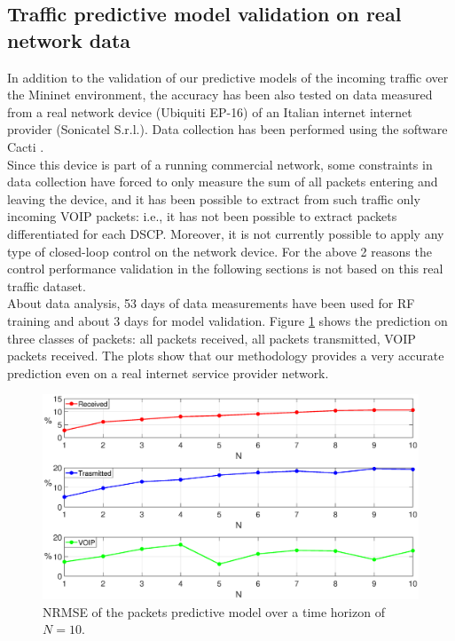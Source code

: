 \subsection{Traffic predictive model validation on real network data}

{In addition to the validation of our predictive models of the incoming traffic over the Mininet environment, the accuracy has been also tested on data measured from a real network device (Ubiquiti EP-16) of an Italian internet internet provider (Sonicatel S.r.l.). Data collection has been performed using the software Cacti \cite{Cacti}.\\
Since this device is part of a running commercial network, some constraints in data collection have forced to only measure the sum of all packets entering and leaving the device, and it has been possible to extract from such traffic only incoming VOIP packets: i.e., it has not been possible to extract packets differentiated for each DSCP. Moreover, it is not currently possible to apply any type of closed-loop control on the network device. For the above 2 reasons the control performance validation in the following sections is not based on this real traffic dataset.\\
About data analysis, 53 days of data measurements have been used for RF training and about 3 days for model validation. Figure \ref{fig:{errorPescara}} shows the prediction on three classes of packets: all packets received, all packets transmitted, VOIP packets received. The plots show that our methodology provides a very accurate prediction even on a real internet service provider network.}
\begin{figure}[h!]
	\centering
	\includegraphics[trim={120 0 120 0}, width=1\linewidth]{figure/Error_PESCARA_DATA.eps}
	\caption{NRMSE of the packets predictive model over a time horizon of $N=10$.}
	\label{fig:{errorPescara}}
\end{figure}
